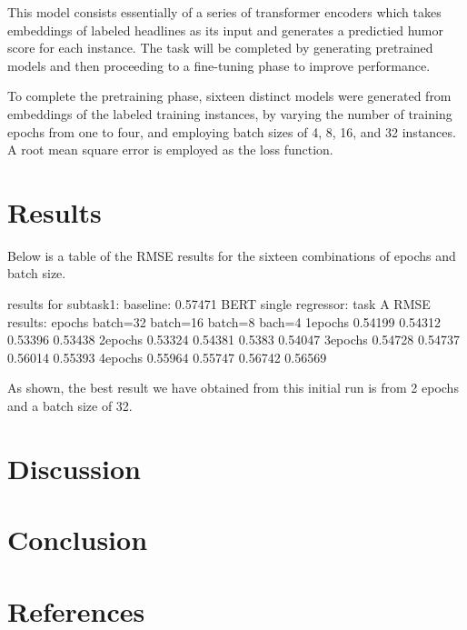 \documentclass{article}
\begin{document}
This model consists essentially of a series of transformer encoders which takes embeddings of labeled headlines as its input and generates a predictied humor score for each instance. The task will be completed by generating pretrained models and then proceeding to a fine-tuning phase to improve performance.

To complete the pretraining phase, sixteen distinct models were generated from embeddings of the labeled training instances, by varying the number of training epochs from one to four, and employing batch sizes of 4, 8, 16, and 32 instances. A root mean square error is employed as the loss function.

\section{Results}

Below is a table of the RMSE results for the sixteen combinations of epochs and batch size.

results for subtask1:
baseline: 0.57471
BERT single regressor:
task A RMSE results:
epochs    batch=32    batch=16    batch=8    bach=4
1epochs    0.54199    0.54312    0.53396    0.53438
2epochs    0.53324    0.54381    0.5383    0.54047
3epochs    0.54728    0.54737    0.56014    0.55393
4epochs    0.55964    0.55747    0.56742    0.56569

As shown, the best result we have obtained from this initial run is from 2 epochs and a batch size of 32.

\section{Discussion}

\section{Conclusion}

\section{References}



\end{document}
